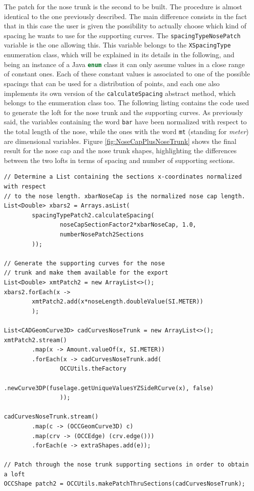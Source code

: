 \bigskip
\noindent
The patch for the nose trunk is the second to be built. The procedure is almost identical to the one previously described. The main difference consists in the fact that in this case the user is given the possibility to actually choose which kind of spacing he wants to use for the supporting curves. The \lstinline[language=Java]!spacingTypeNosePatch! variable is the one allowing this. This variable belongs to the \lstinline[language=Java]!XSpacingType! enumeration class, which will be explained in its details in the following, and being an instance of a Java \lstinline[language=Java]!enum! class it can only assume values in a close range of constant ones. Each of these constant values is associated to one of the possible spacings that can be used for a distribution of points, and each one also implements its own version of the \lstinline[language=Java]!calculateSpacing! abstract method, which belongs to the enumeration class too. The following listing contains the code used to generate the loft for the nose trunk and the supporting curves. As previously said, the variables containing the word \lstinline[language=Java]!bar! have been normalized with respect to the total length of the nose, while the ones with the word \lstinline[language=Java]!mt! (standing for \emph{meter}) are dimensional variables. Figure \ref{fig:NoseCapPlusNoseTrunk} shows the final result for the nose cap and the nose trunk shapes, highlighting the differences between the two lofts in terms of spacing and number of supporting sections.
%
\bigskip
\begin{lstlisting}[caption={Nose trunk shapes building process}, captionpos=b, tabsize=2, label={lst:NoseTrunkCreation}]
// Determine a List containing the sections x-coordinates normalized with respect 
// to the nose length. xbarNoseCap is the normalized nose cap length. 
List<Double> xbars2 = Arrays.asList(
		spacingTypePatch2.calculateSpacing(
				noseCapSectionFactor2*xbarNoseCap, 1.0,
				numberNosePatch2Sections
		));

// Generate the supporting curves for the nose 
// trunk and make them available for the export		
List<Double> xmtPatch2 = new ArrayList<>();
xbars2.forEach(x -> 
		xmtPatch2.add(x*noseLength.doubleValue(SI.METER))
		);
			  				
List<CADGeomCurve3D> cadCurvesNoseTrunk = new ArrayList<>();
xmtPatch2.stream()
		.map(x -> Amount.valueOf(x, SI.METER))
		.forEach(x -> cadCurvesNoseTrunk.add(
				OCCUtils.theFactory
						.newCurve3DP(fuselage.getUniqueValuesYZSideRCurve(x), false)
				));
					   
cadCurvesNoseTrunk.stream()
		.map(c -> (OCCGeomCurve3D) c)
		.map(crv -> (OCCEdge) (crv.edge()))
		.forEach(e -> extraShapes.add(e));

// Patch through the nose trunk supporting sections in order to obtain a loft					   
OCCShape patch2 = OCCUtils.makePatchThruSections(cadCurvesNoseTrunk);
\end{lstlisting}

